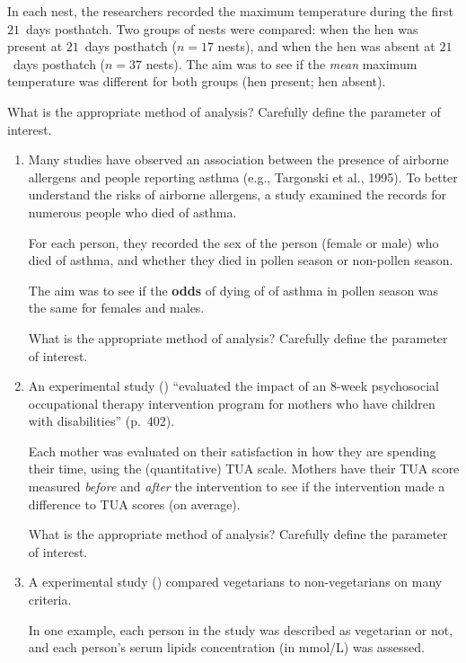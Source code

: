 \documentclass[
  11pt,
  a4paper,
  krantz2]{krantz}
\newlength{\greyboxheight}
\newcommand{\setgreyboxheight}[1]{%
  \setlength{\greyboxheight}{2.3\baselineskip * #1}%
}
\newenvironment{greybox}[1]{%
  \nopagebreak
  \setgreyboxheight{#1}%
  \begin{tcolorbox}[
    colframe=gray!30!black,
    boxrule=2pt,
    width=\linewidth,
    height=\greyboxheight,
    valign=center,
    colback=white,
    left=4pt,
    right=4pt, 
    top=4pt, 
    bottom=4pt,
    before skip=4pt,
    after skip=4pt
  ]
\vspace*{\greyboxheight} %
}{%
  \end{tcolorbox}
  \goodbreak
}
\newcommand{\greyboxlines}[1]{\noindent\begin{greybox}{#1}\end{greybox}}
\begin{document}
In each nest, the researchers recorded the maximum temperature during the first \(21\)~days posthatch.
Two groups of nests were compared: when the hen was present at \(21\)~days posthatch (\(n = 17\) nests), and when the hen was absent at \(21\)~days posthatch (\(n = 37\) nests).
The aim was to see if the \emph{mean} maximum temperature was different for both groups (hen present; hen absent).

What is the appropriate method of analysis?
Carefully define the parameter of interest.
\greyboxlines{2}

\begin{enumerate}
\def\labelenumi{\arabic{enumi}.}
\setcounter{enumi}{1}
\item
  Many studies have observed an association between the presence of airborne allergens and people reporting asthma (e.g., Targonski et al., 1995). To better understand the risks of airborne allergens, a study examined the records for numerous people who died of asthma.

  For each person, they recorded the sex of the person (female or male) who died of asthma, and whether they died in pollen season or non-pollen season.

  The aim was to see if the \textbf{odds} of dying of of asthma in pollen season was the same for females and males.

  What is the appropriate method of analysis?
  Carefully define the parameter of interest.
  \greyboxlines{2}
\item
  An experimental study () ``evaluated the impact of an 8-week psychosocial occupational therapy intervention program for mothers who have children with disabilities'' (p.~402).

  Each mother was evaluated on their satisfaction in how they are spending their time, using the (quantitative) TUA scale.
  Mothers have their TUA score measured \emph{before} and \emph{after} the intervention to see if the intervention made a difference to TUA scores (on average).

  What is the appropriate method of analysis?
  Carefully define the parameter of interest.
  \greyboxlines{2}
\item
  A experimental study () compared vegetarians to non-vegetarians on many criteria.

  In one example, each person in the study was described as vegetarian or not, and each person's serum lipids concentration (in mmol/L) was assessed.


\end{enumerate}
\end{document}
